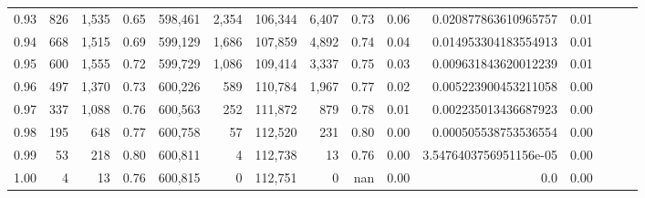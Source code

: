 \begin{tabular}{rrrrrrrrrrrrrrr}
0.93 &     826 &  1,535 &  0.65 &  598,461 &    2,354 &  106,344 &    6,407 &  0.73 &  0.06 &    0.020877863610965757 &      0.01 \\
0.94 &     668 &  1,515 &  0.69 &  599,129 &    1,686 &  107,859 &    4,892 &  0.74 &  0.04 &    0.014953304183554913 &      0.01 \\
0.95 &     600 &  1,555 &  0.72 &  599,729 &    1,086 &  109,414 &    3,337 &  0.75 &  0.03 &    0.009631843620012239 &      0.01 \\
0.96 &     497 &  1,370 &  0.73 &  600,226 &      589 &  110,784 &    1,967 &  0.77 &  0.02 &    0.005223900453211058 &      0.00 \\
0.97 &     337 &  1,088 &  0.76 &  600,563 &      252 &  111,872 &      879 &  0.78 &  0.01 &    0.002235013436687923 &      0.00 \\
0.98 &     195 &    648 &  0.77 &  600,758 &       57 &  112,520 &      231 &  0.80 &  0.00 &    0.000505538753536554 &      0.00 \\
0.99 &      53 &    218 &  0.80 &  600,811 &        4 &  112,738 &       13 &  0.76 &  0.00 &  3.5476403756951156e-05 &      0.00 \\
1.00 &       4 &     13 &  0.76 &  600,815 &        0 &  112,751 &        0 &   nan &  0.00 &                     0.0 &      0.00 \\
\bottomrule
\end{tabular}
